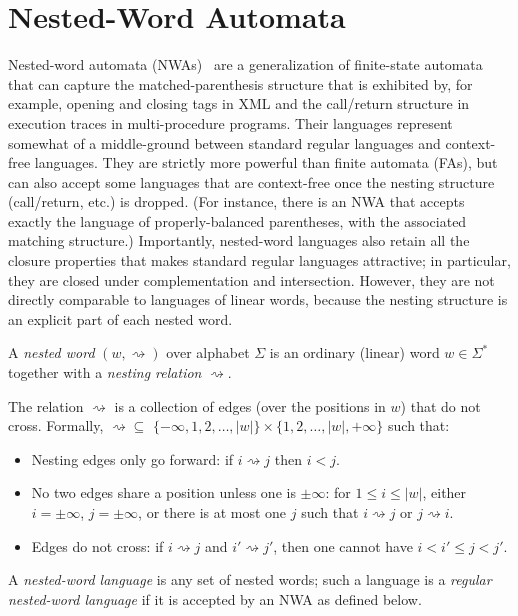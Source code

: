 \section{Nested-Word Automata}
\label{App:nwa-definition}

Nested-word automata (NWAs)~\cite{DLT:AM2006,JACM:AM2009} are a generalization
of finite-state automata that can capture the matched-parenthesis structure
that is exhibited by, for example, opening and closing tags in XML and the
call/return structure in execution traces in multi-procedure
programs. Their languages represent somewhat of a middle-ground between
standard regular languages and context-free languages. They are strictly more
powerful than finite automata (FAs), but can also accept some languages that
are context-free once the nesting structure (call/return, etc.) is dropped. (For instance,
there is an NWA that
accepts exactly the language of properly-balanced parentheses, with the
associated matching structure.) Importantly, nested-word languages also retain all the closure
properties that makes standard regular languages attractive; in particular,
they are closed under complementation and intersection. However, they are not
directly comparable to languages of linear words, because the nesting
structure is an explicit part of each nested word.

\begin{definition}
  A \emph{nested word} $(w,\rightsquigarrow)$ over alphabet $\Sigma$ is an
  ordinary (linear) word $w \in \Sigma^*$ together with a
  \emph{nesting relation} $\rightsquigarrow$.

  The relation $\rightsquigarrow$ is a collection of edges (over the
  positions in $w$) that do not cross. Formally, $\rightsquigarrow \subseteq$
  $\{-\infty, 1, 2, \ldots, |w| \} \times \{1, 2, \ldots, |w|, +\infty\}$
  such that:
  \begin{itemize}
    \item
      Nesting edges only go forward: if $i \rightsquigarrow j$ then $i < j$.
    \item
      No two edges share a position unless one is $\pm\infty$: for $1
      \leq i \leq |w|$, either $i=\pm\infty$, $j=\pm\infty$, or
      there is at
      most one $j$ such that $i \rightsquigarrow j$ or $j \rightsquigarrow
      i$.
    \item
      Edges do not cross: if $i \rightsquigarrow j$ and $i' \rightsquigarrow
      j'$, then one cannot have $i < i' \leq j < j'$.
  \end{itemize}

  A \emph{nested-word language} is any set of nested words; such a language
  is a \emph{regular nested-word language} if it is accepted by an NWA as
  defined below.
\end{definition}

